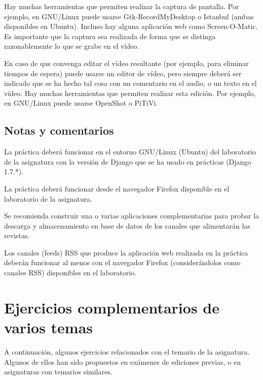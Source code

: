 Hay muchas herramientas que permiten realizar la captura de pantalla. Por ejemplo, en GNU/Linux puede usarse Gtk-RecordMyDesktop o Istanbul (ambas disponibles en Ubuntu). Incluso hay alguna aplicación web como Screen-O-Matic. Es importante que la captura sea realizada de forma que se distinga razonablemente lo que se grabe en el vídeo.

En caso de que convenga editar el vídeo resultante (por ejemplo, para eliminar tiempos de espera) puede usarse un editor de vídeo, pero siempre deberá ser indicado que se ha hecho tal cosa con un comentario en el audio, o un texto en el vídeo. Hay muchas herramientas que permiten realizar esta edición. Por ejemplo, en GNU/Linux puede usarse OpenShot o PiTiVi.

\subsection{Notas y comentarios}

La práctica deberá funcionar en el entorno GNU/Linux (Ubuntu) del laboratorio de la asignatura con la versión de Django que se ha usado en prácticas (Django 1.7.*).

La práctica deberá funcionar desde el navegador Firefox disponible en el laboratorio de la asignatura.

Se recomienda construir una o varias aplicaciones complementarias para probar la descarga y almacenamiento en base de datos de los canales que alimentarán las revistas.

Los canales (feeds) RSS que produce la aplicación web realizada en la práctica deberán funcionar al menos con el navegador Firefox (considerándolos como canales RSS) disponibles en el laboratorio.


\newpage



\section{Ejercicios complementarios de varios temas}

A continuación, algunos ejercicios relacionados con el temario de la asignatura. Algunos de ellos han sido propuestos en exámenes de ediciones previas, o en asignaturas con temarios similares.

